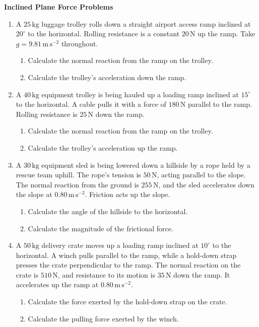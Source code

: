 \documentclass[11pt,a4paper]{article}
\begin{document}
\begin{center}
    {\Large\bfseries Inclined Plane Force Problems}
\end{center}

\begin{enumerate}
    \item A \(25\,\mathrm{kg}\) luggage trolley rolls down a straight airport access ramp inclined at \(20^\circ\) to the horizontal. Rolling resistance is a constant \(20\,\mathrm{N}\) up the ramp. Take \(g=9.81\,\mathrm{m\,s^{-2}}\) throughout.
    \begin{enumerate}[label=(\alph*)]
        \item Calculate the normal reaction from the ramp on the trolley.
        \item Calculate the trolley's acceleration down the ramp.
    \end{enumerate}

    \item A \(40\,\mathrm{kg}\) equipment trolley is being hauled up a loading ramp inclined at \(15^\circ\) to the horizontal. A cable pulls it with a force of \(180\,\mathrm{N}\) parallel to the ramp. Rolling resistance is \(25\,\mathrm{N}\) down the ramp.
    \begin{enumerate}[label=(\alph*)]
        \item Calculate the normal reaction from the ramp on the trolley.
        \item Calculate the trolley's acceleration up the ramp.
    \end{enumerate}

    \item A \(30\,\mathrm{kg}\) equipment sled is being lowered down a hillside by a rope held by a rescue team uphill. The rope's tension is \(50\,\mathrm{N}\), acting parallel to the slope. The normal reaction from the ground is \(255\,\mathrm{N}\), and the sled accelerates down the slope at \(0.80\,\mathrm{m\,s^{-2}}\). Friction acts up the slope.
    \begin{enumerate}[label=(\alph*)]
        \item Calculate the angle of the hillside to the horizontal.
        \item Calculate the magnitude of the frictional force.
    \end{enumerate}

    \item A \(50\,\mathrm{kg}\) delivery crate moves up a loading ramp inclined at \(10^\circ\) to the horizontal. A winch pulls parallel to the ramp, while a hold-down strap presses the crate perpendicular to the ramp. The normal reaction on the crate is \(510\,\mathrm{N}\), and resistance to its motion is \(35\,\mathrm{N}\) down the ramp. It accelerates up the ramp at \(0.80\,\mathrm{m\,s^{-2}}\).
    \begin{enumerate}[label=(\alph*)]
        \item Calculate the force exerted by the hold-down strap on the crate.
        \item Calculate the pulling force exerted by the winch.
    \end{enumerate}
\end{enumerate}
\end{document}
